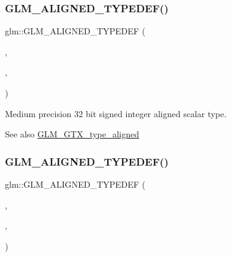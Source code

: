 \subsubsection{\texorpdfstring{G\+L\+M\+\_\+\+A\+L\+I\+G\+N\+E\+D\+\_\+\+T\+Y\+P\+E\+D\+E\+F()}{GLM\_ALIGNED\_TYPEDEF()}\hspace{0.1cm}{\footnotesize\ttfamily [19/209]}}
{\footnotesize\ttfamily glm\+::\+G\+L\+M\+\_\+\+A\+L\+I\+G\+N\+E\+D\+\_\+\+T\+Y\+P\+E\+D\+EF (\begin{DoxyParamCaption}\item[{\hyperlink{group__gtc__type__precision_gafd9b4bd9e4465aec63351b59100692c4}{mediump\+\_\+int32\+\_\+t}}]{,  }\item[{aligned\+\_\+mediump\+\_\+int32\+\_\+t}]{,  }\item[{4}]{ }\end{DoxyParamCaption})}

Medium precision 32 bit signed integer aligned scalar type. \begin{DoxySeeAlso}{See also}
\hyperlink{group__gtx__type__aligned}{G\+L\+M\+\_\+\+G\+T\+X\+\_\+type\+\_\+aligned} 
\end{DoxySeeAlso}
\mbox{\label{group__gtx__type__aligned_ga73fdc86a539808af58808b7c60a1c4d8}} 
\subsubsection{\texorpdfstring{G\+L\+M\+\_\+\+A\+L\+I\+G\+N\+E\+D\+\_\+\+T\+Y\+P\+E\+D\+E\+F()}{GLM\_ALIGNED\_TYPEDEF()}\hspace{0.1cm}{\footnotesize\ttfamily [20/209]}}
{\footnotesize\ttfamily glm\+::\+G\+L\+M\+\_\+\+A\+L\+I\+G\+N\+E\+D\+\_\+\+T\+Y\+P\+E\+D\+EF (\begin{DoxyParamCaption}\item[{\hyperlink{group__gtc__type__precision_ga555a2f85641550c232db473a9bb981f7}{mediump\+\_\+int64\+\_\+t}}]{,  }\item[{aligned\+\_\+mediump\+\_\+int64\+\_\+t}]{,  }\item[{8}]{ }\end{DoxyParamCaption})}

